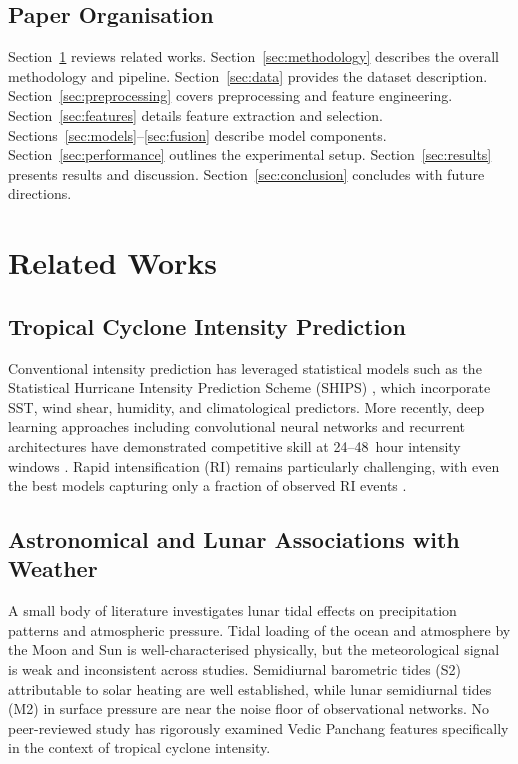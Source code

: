 \documentclass[12pt,a4paper]{article}
\begin{document}
\subsection{Paper Organisation}

Section~\ref{sec:related} reviews related works. Section~\ref{sec:methodology}
describes the overall methodology and pipeline. Section~\ref{sec:data} provides
the dataset description. Section~\ref{sec:preprocessing} covers preprocessing
and feature engineering. Section~\ref{sec:features} details feature extraction
and selection. Sections~\ref{sec:models}--\ref{sec:fusion} describe model
components. Section~\ref{sec:performance} outlines the experimental setup.
Section~\ref{sec:results} presents results and discussion. Section~\ref{sec:conclusion}
concludes with future directions.

\section{Related Works}
\label{sec:related}

\subsection{Tropical Cyclone Intensity Prediction}

Conventional intensity prediction has leveraged statistical models such as
the Statistical Hurricane Intensity Prediction Scheme (SHIPS) \cite{demaria2014advances},
which incorporate SST, wind shear, humidity, and climatological predictors.
More recently, deep learning approaches including convolutional neural networks
and recurrent architectures have demonstrated competitive skill at 24--48~hour
intensity windows \cite{zhang2018tropical}. Rapid intensification (RI) remains
particularly challenging, with even the best models capturing only a fraction
of observed RI events \cite{kaplan2003}.

\subsection{Astronomical and Lunar Associations with Weather}

A small body of literature investigates lunar tidal effects on precipitation
patterns and atmospheric pressure. Tidal loading of the ocean and atmosphere
by the Moon and Sun is well-characterised physically, but the meteorological
signal is weak and inconsistent across studies. Semidiurnal barometric tides
(S2) attributable to solar heating are well established, while lunar semidiurnal
tides (M2) in surface pressure are near the noise floor of observational
networks. No peer-reviewed study has rigorously examined Vedic Panchang features
specifically in the context of tropical cyclone intensity.
\end{document}
